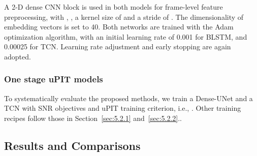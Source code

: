 \documentclass[journal]{IEEEtran}
\begin{document}
A 2-D dense CNN block is used in both models for frame-level feature preprocessing, with , , a kernel size of   and a stride of .
The dimensionality of embedding vectors  is set to 40.
Both networks are trained with the Adam optimization algorithm, with an initial learning rate of 0.001 for BLSTM, and 0.00025 for TCN.
Learning rate adjustment and early stopping are again adopted.



\subsubsection{One stage uPIT models}
\label{sec:5.2.3}
To systematically evaluate the proposed methods, we train a Dense-UNet and a TCN with SNR objectives and uPIT training criterion, i.e., .
Other training recipes follow those in Section~\ref{sec:5.2.1} and~\ref{sec:5.2.2}..


\subsection{Results and Comparisons}
\label{sec:5.3}

      \begin{table}[!t]
\renewcommand{\arraystretch}{1.2}
    \caption{SDR, PESQ and ESTOI for simultaneous grouping models with optimal output assignment on WSJ0-2mix OC.}
    \label{TABLE1}
    \centering

    \end{table}
\end{document}
